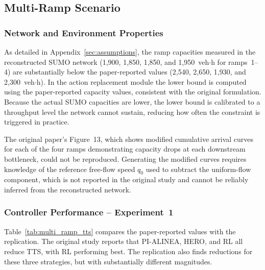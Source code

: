 \subsection{Multi-Ramp Scenario}

\subsubsection{Network and Environment Properties}

As detailed in Appendix~\ref{sec:assumptions}, the ramp capacities measured in the reconstructed SUMO network (1{,}900, 1{,}850, 1{,}850, and 1{,}950~veh$\cdot$h for ramps~1--4) are substantially below the paper-reported values (2{,}540, 2{,}650, 1{,}930, and 2{,}300~veh$\cdot$h). In the action replacement module the lower bound is computed using the paper-reported capacity values, consistent with the original formulation. Because the actual SUMO capacities are lower, the lower bound is calibrated to a throughput level the network cannot sustain, reducing how often the constraint is triggered in practice.

The original paper's Figure~13, which shows modified cumulative arrival curves for each of the four ramps demonstrating capacity drops at each downstream bottleneck, could not be reproduced. Generating the modified curves requires knowledge of the reference free-flow speed $q_0$ used to subtract the uniform-flow component, which is not reported in the original study and cannot be reliably inferred from the reconstructed network.


\subsubsection{Controller Performance -- Experiment~1}

Table~\ref{tab:multi_ramp_tts} compares the paper-reported values with the replication. The original study reports that PI-ALINEA, HERO, and RL all reduce TTS, with RL performing best. The replication also finds reductions for these three strategies, but with substantially different magnitudes.


